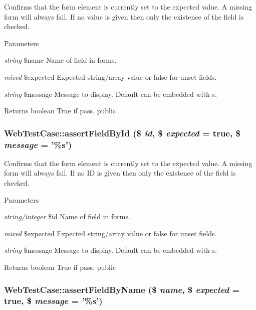 \label{class_web_test_case_a2ff4ade56d51b73cd30290456ee94d74}
Confirms that the form element is currently set to the expected value. A missing form will always fail. If no value is given then only the existence of the field is checked. 
\begin{DoxyParams}{Parameters}
\item[{\em string}]\$name Name of field in forms. \item[{\em mixed}]\$expected Expected string/array value or false for unset fields. \item[{\em string}]\$message Message to display. Default can be embedded with s. \end{DoxyParams}
\begin{DoxyReturn}{Returns}
boolean True if pass.  public 
\end{DoxyReturn}
\hypertarget{class_web_test_case_a5bb2fcfa5ff8540f77829901370ade99}{
\subsubsection[{assertFieldById}]{\setlength{\rightskip}{0pt plus 5cm}WebTestCase::assertFieldById (\$ {\em id}, \/  \$ {\em expected} = {\ttfamily true}, \/  \$ {\em message} = {\ttfamily '\%s'})}}
\label{class_web_test_case_a5bb2fcfa5ff8540f77829901370ade99}
Confirms that the form element is currently set to the expected value. A missing form will always fail. If no ID is given then only the existence of the field is checked. 
\begin{DoxyParams}{Parameters}
\item[{\em string/integer}]\$id Name of field in forms. \item[{\em mixed}]\$expected Expected string/array value or false for unset fields. \item[{\em string}]\$message Message to display. Default can be embedded with s. \end{DoxyParams}
\begin{DoxyReturn}{Returns}
boolean True if pass.  public 
\end{DoxyReturn}
\hypertarget{class_web_test_case_abfdb01d4f19a545a174dc1989d1edc88}{
\subsubsection[{assertFieldByName}]{\setlength{\rightskip}{0pt plus 5cm}WebTestCase::assertFieldByName (\$ {\em name}, \/  \$ {\em expected} = {\ttfamily true}, \/  \$ {\em message} = {\ttfamily '\%s'})}}
